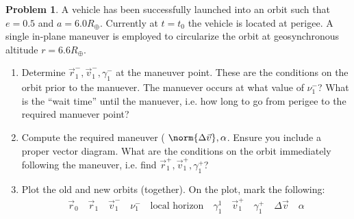 \documentclass[10pt]{article}
\theoremstyle{definition}
\newtheorem{prob}{Problem}[section]
\newenvironment{subprob}%
{\renewcommand{\theenumi}{\alph{enumi}}\renewcommand{\labelenumi}{(\theenumi)}\begin{enumerate}}%
{\end{enumerate}}%
\begin{document}
\begin{prob}
    A vehicle has been successfully launched into an orbit such that \( e = 0.5 \) and \( a = 6.0 R_{\oplus} \). 
    Currently at \( t = t_0 \) the vehicle is located at perigee.
    A single in-plane maneuver is employed to circularize the orbit at geosynchronous altitude \( r = 6.6 R_{\oplus} \).
    \begin{subprob}
    \item Determine \( \vec r_1^{-} , \vec v_1^{-}, \gamma_1^{-} \)  at the maneuver point.
        These are the conditions on the orbit prior to the manuever.
        The manuever occurs at what value of \( \nu_1^{-} \)?
        What is the ``wait time'' until the manuever, i.e. how long to go from perigee to the required manuever point?
    \item Compute the required maneuver ( \( \norm{\Delta \vec v}, \alpha \).
        Ensure you include a proper vector diagram.
        What are the conditions on the orbit immediately following the maneuver, i.e. find \( \vec r_1^{+} , \vec v_1^{+}, \gamma_1^{+} \)?
    \item Plot the old and new orbits (together).
        On the plot, mark the following:
        \begin{align*}
            \vec r_0 \quad \vec r_1 \quad \vec v_1^{-} \quad \nu_1^{-} \quad \text{local horizon} \quad \gamma_1^{1} \quad \vec v_1^{+} \quad \gamma_1^{+} \quad \Delta \vec v \quad \alpha 
        \end{align*}
    \end{subprob}
\end{prob}
\end{document}
